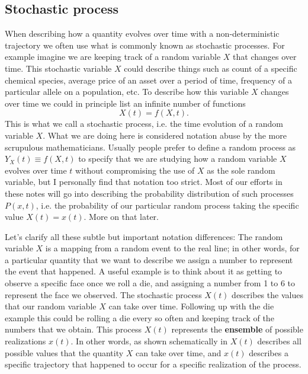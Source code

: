 \subsection{Stochastic process}

When describing how a quantity evolves over time with a non-deterministic
trajectory we often use what is commonly known as stochastic processes. For
example imagine we are keeping track of a random variable $X$ that changes over
time. This stochastic variable $X$ could describe things such as count of a
specific chemical species, average price of an asset over a period of time,
frequency of a particular allele on a population, etc. To describe how this
variable $X$ changes over time we could in principle list an infinite number of
functions
\begin{equation}
  X(t) = f(X, t).
\end{equation}
This is what we call a stochastic process, i.e. the time evolution of a random
variable $X$. What we are doing here is considered notation abuse by the more
scrupulous mathematicians. Usually people prefer to define a random process as
$Y_X(t) \equiv f(X, t)$ to specify that we are studying how a random variable
$X$ evolves over time $t$ without compromising the use of $X$ as the sole
random variable, but I personally find that notation too strict. Most of our
efforts in these notes will go into describing the probability distribution of
such processes $P(x, t)$, i.e. the probability of our particular random process
taking the specific value $X(t) = x(t)$. More on that later.

Let's clarify all these subtle but important notation differences: The random
variable $X$ is a mapping from a random event to the real line; in other words,
for a particular quantity that we want to describe we assign a number to
represent the event that happened. A useful example is to think about it as
getting to observe a specific face once we roll a die, and assigning a number
from 1 to 6 to represent the face we observed. The stochastic process $X(t)$
describes the values that our random variable $X$ can take over time. Following
up with the die example this could be rolling a die every so often and keeping
track of the numbers that we obtain. This process $X(t)$ represents the
\textbf{ensemble} of possible realizations $x(t)$. In other words, as shown
schematically in  $X(t)$ describes all possible values that
the quantity $X$ can take over time, and $x(t)$ describes a specific trajectory
that happened to occur for a specific realization of the process.

